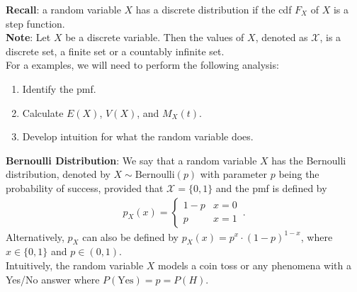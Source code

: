 \documentclass[11pt,oneside]{book}
\theoremstyle{newStyle}
\begin{document}
\textbf{Recall}: a random variable $X$ has a discrete distribution if the cdf $F_X$ of $X$ is a step function.\\

\textbf{Note}: Let $X$ be a discrete variable. Then the values of $X$, denoted as $\mathcal{X}$, is a discrete set, a finite set or a countably infinite set.\\

For a examples, we will need to perform the following analysis:
\begin{enumerate}
\item Identify the pmf.
\item Calculate $E(X)$, $V(X)$, and $M_X(t)$. 
\item Develop intuition for what the random variable does.
\end{enumerate}


\newpage
\textbf{Bernoulli Distribution}: We say that a random variable $X$ has the Bernoulli distribution, denoted by $X \sim \text{Bernoulli}(p)$ with parameter $p$ being the probability of success, provided that $\mathcal{X} = \{0,1\}$ and the pmf is defined by
\begin{align*}
p_X(x) = \begin{cases}
1-p & x =0\\
p & x=1
\end{cases}\,.
\end{align*}
Alternatively, $p_X$ can also be defined by $p_X(x) = p^x \cdot (1-p)^{1-x}$, where $x \in \{0,1\}$ and $p \in (0,1)$.\\

Intuitively, the random variable $X$ models a coin toss or any phenomena with a Yes/No answer where $P(\text{Yes}) = p = P(H)$.\\
\end{document}
